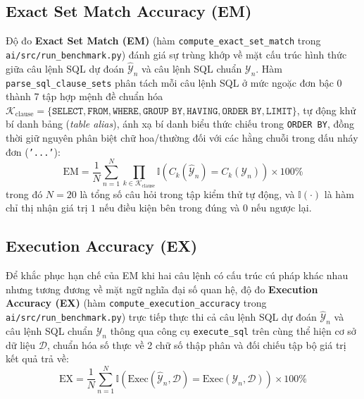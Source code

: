 \documentclass[12pt,a4paper]{report}
\begin{document}
\subsection{Exact Set Match Accuracy (EM)}
Độ đo \textbf{Exact Set Match (EM)} (hàm \texttt{compute\_exact\_set\_match} trong \texttt{ai/src/run\_benchmark.py}) đánh giá sự trùng khớp về mặt cấu trúc hình thức giữa câu lệnh SQL dự đoán $\hat{\mathcal{Y}}_n$ và câu lệnh SQL chuẩn $\mathcal{Y}_n$. Hàm \texttt{parse\_sql\_clause\_sets} phân tách mỗi câu lệnh SQL ở mức ngoặc đơn bậc 0 thành 7 tập hợp mệnh đề chuẩn hóa $\mathcal{K}_{\text{clause}} = \{\texttt{SELECT}, \texttt{FROM}, \texttt{WHERE}, \texttt{GROUP BY}, \texttt{HAVING}, \texttt{ORDER BY}, \texttt{LIMIT}\}$, tự động khử bí danh bảng (\textit{table alias}), ánh xạ bí danh biểu thức chiếu trong \texttt{ORDER BY}, đồng thời giữ nguyên phân biệt chữ hoa/thường đối với các hằng chuỗi trong dấu nháy đơn (\texttt{'...'}):
\begin{equation}
    \text{EM} = \frac{1}{N} \sum_{n=1}^{N} \prod_{k \in \mathcal{K}_{\text{clause}}} \mathbb{I}\left( C_k\left(\hat{\mathcal{Y}}_n\right) = C_k\left(\mathcal{Y}_n\right) \right) \times 100\%
    \label{eq:metric_em}
\end{equation}
trong đó $N = 20$ là tổng số câu hỏi trong tập kiểm thử tự động, và $\mathbb{I}(\cdot)$ là hàm chỉ thị nhận giá trị $1$ nếu điều kiện bên trong đúng và $0$ nếu ngược lại.

\subsection{Execution Accuracy (EX)}
Để khắc phục hạn chế của EM khi hai câu lệnh có cấu trúc cú pháp khác nhau nhưng tương đương về mặt ngữ nghĩa đại số quan hệ, độ đo \textbf{Execution Accuracy (EX)} (hàm \texttt{compute\_execution\_accuracy} trong \texttt{ai/src/run\_benchmark.py}) trực tiếp thực thi cả câu lệnh SQL dự đoán $\hat{\mathcal{Y}}_n$ và câu lệnh SQL chuẩn $\mathcal{Y}_n$ thông qua công cụ \texttt{execute\_sql} trên cùng thể hiện cơ sở dữ liệu $\mathcal{D}$, chuẩn hóa số thực về 2 chữ số thập phân và đối chiếu tập bộ giá trị kết quả trả về:
\begin{equation}
    \text{EX} = \frac{1}{N} \sum_{n=1}^{N} \mathbb{I}\left( \text{Exec}\left(\hat{\mathcal{Y}}_n, \mathcal{D}\right) = \text{Exec}\left(\mathcal{Y}_n, \mathcal{D}\right) \right) \times 100\%
    \label{eq:metric_ex}
\end{equation}
\end{document}
